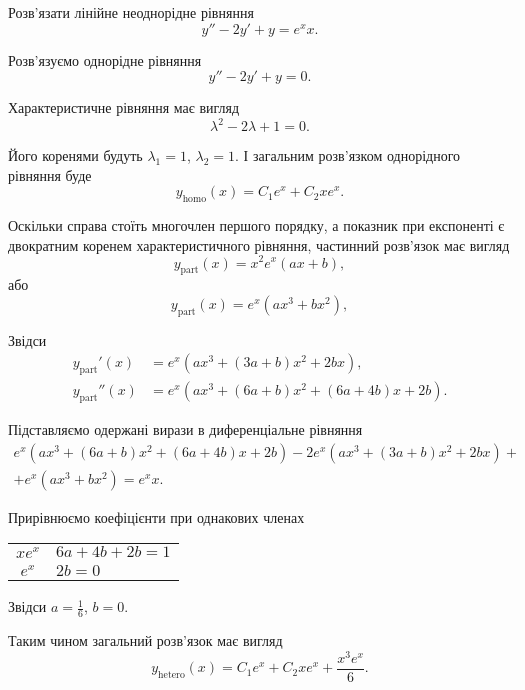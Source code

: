 \begin{example}
	Розв'язати лінійне неоднорідне рівняння \[ y'' - 2 y' + y = e^x x.\]
\end{example}

\begin{solution}
	Розв'язуємо однорідне рівняння
	\begin{equation*}
		y'' - 2 y' + y = 0.
	\end{equation*}
	
	Характеристичне рівняння має вигляд
	\begin{equation*}
		\lambda^2 - 2 \lambda + 1 = 0.
	\end{equation*}
	
	Його коренями будуть $\lambda_1 = 1$, $\lambda_2 = 1$. І загальним роз\-в'яз\-ком однорідного рівняння буде
	\begin{equation*}
		y_{\text{homo}}(x) = C_1 e^x + C_2 x e^x.
	\end{equation*}

	Оскільки справа стоїть многочлен першого порядку, а показник при експоненті є двократним коренем характеристичного рівняння, частинний розв'язок має вигляд
	\begin{equation*}
		y_{\text{part}}(x) = x^2 e^x (a x + b),
	\end{equation*}
	або
	\begin{equation*}
		y_{\text{part}}(x) = e^x (a x^3 + b x^2),
	\end{equation*}

	Звідси
	\begin{align*}
		y_{\text{part}}'(x) &= e^x (a x^3 + (3 a + b) x^2 + 2 b x), \\
		y_{\text{part}}''(x) &= e^x (a x^3 + (6 a + b) x^2 + (6 a + 4 b) x + 2 b).
	\end{align*}

	Підставляємо одержані вирази в диференціальне рівняння
	\begin{multline*}
		e^x (a x^3 + (6 a + b) x^2 + (6 a + 4 b) x + 2 b) - 2 e^x (a x^3 + (3 a + b) x^2 + 2 b x) + \\ + e^x (a x^3 + b x^2) = e^x x.
	\end{multline*}

	Прирівнюємо коефіцієнти при однакових членах
	\begin{table}[H]
		\centering
		\begin{tabular}{c|l}
			$x e^x$ & $6 a + 4 b + 2 b = 1$ \\
			$e^x$ & $2 b = 0$
		\end{tabular}
	\end{table}

	Звідси $a = \frac16$, $b = 0$. \parvskip

	Таким чином загальний розв'язок має вигляд
	\begin{equation}
		y_{\text{hetero}}(x) = C_1 e^x + C_2 x e^x + \frac{x^3 e^x}{6}.
	\end{equation}
\end{solution}

